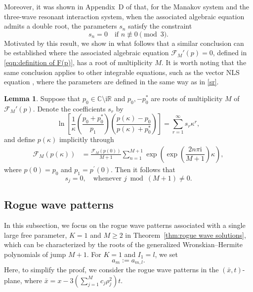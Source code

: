 \documentclass[preprint,3p,10pt]{elsarticle}
\theoremstyle{definition}
\newtheorem{lemma}{Lemma}[section]
\begin{document}
Moreover, it was shown in Appendix~D of \cite{yang2023rogue} that, for the Manakov system and the three-wave resonant interaction system, when the associated algebraic equation admits a double root, the parameters $s_n$ satisfy the constraint
\begin{equation}
    s_n = 0 \quad \text{if } n \not\equiv 0 \pmod{3}.
\end{equation}
Motivated by this result, we show in what follows that a similar conclusion can be established where the associated algebraic equation $\mathcal{F}_M'(p)=0$, defined in \eqref{eqn:definition of F(p)}, has a root of multiplicity $M$. It is worth noting that the same conclusion applies to other integrable equations, such as the vector NLS equation \cite{zhang2022rogue}, where the parameters are defined in the same way as in \eqref{sr}.



\begin{lemma}\label{lemma:expansion of s_r}
Suppose that \(p_0\in\mathbb C\setminus\mathrm{i}\mathbb R\) and
\(p_0,-p_0^*\) are roots of multiplicity \(M\) of
\(\mathcal F_M'(p)\).
Denote the coefficients $s_r$ by
\begin{equation}
 \ln \left[\frac{1}{\kappa}\left(\frac{p_{0}+p_{0}^{*}}{p_{1}}\right)\left(\frac{p(\kappa)-p_{0}}{p(\kappa)+p_{0}^{*}}\right)\right]
 = \sum_{r=1}^{\infty} s_{r} \kappa^{r},
\end{equation}
and define $p(\kappa)$ implicitly through
\begin{equation}
\begin{aligned}
 \mathcal{F}_M(p(\kappa))
 &= \frac{\mathcal{F}_M(p(0))}{M+1}
\sum_{n=1}^{M+1} \exp\left(\exp\left(\dfrac{2 n \pi \mathrm{i}}{M+1}\right) \kappa\right),
\end{aligned}
\end{equation}
where $p(0)=p_0$ and $p_1=p^{\prime}(0)$.  
Then it follows that
\begin{equation}
 s_j = 0, \quad \text{whenever } j \bmod (M+1) \neq 0 .
\end{equation}

\end{lemma}

\subsection{Rogue wave patterns}
In this subsection, we focus on the rogue wave patterns associated with a single large free parameter, $K=1$ and $M\ge2$ in Theorem~\ref{thm:rogue wave solutions}, which can be characterized by the roots of the generalized Wronskian--Hermite polynomials of jump $M+1$. For \(K=1\) and \(I_1=l\), we set
\begin{equation}
    a_m:=a_{m,l}.
\end{equation} 
Here, to simplify the proof, we consider the rogue wave patterns in the \((\bar{x},t)\)-plane, where $\bar{x}=x-3\left(\sum_{j=1}^{M}c_j \rho_j^2\right)t$.
\end{document}
